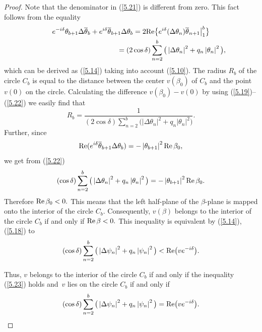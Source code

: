 \documentclass[11pt]{article}
\numberwithin{equation}{section}
\begin{document}
\begin{proof}
Note that the denominator in (\ref{5.21}) is dif\/ferent from zero. This fact
follows from the equality%
\begin{gather}
e^{-i\delta }\theta _{b+1}\Delta \overline{\theta }_{b}+e^{i\delta }%
\overline{\theta }_{b+1}\Delta \theta _{b}=2{\rm Re}\big\{ e^{i\delta
}(\Delta \theta _{n})\overline{\theta }_{n+1}\big|_{1}^{b}\big\}\nonumber\\
\phantom{e^{-i\delta }\theta _{b+1}\Delta \overline{\theta }_{b}+e^{i\delta }%
\overline{\theta }_{b+1}\Delta \theta _{b}}{}
=(2\cos \delta )\sum_{n=2}^{b}\big( \left\vert \Delta \theta
_{n}\right\vert ^{2}+q_{n}\left\vert \theta _{n}\right\vert ^{2}\big),
\label{5.22}
\end{gather}%
which can be derived as (\ref{5.14}) taking into account (\ref{5.10}). The
radius $R_{b}$ of the circle $C_{b}$ is equal to the distance between the
center $v(\beta _{0})$ of $C_{b}$ and the point $v(0)$ on the circle.
Calculating the dif\/ference $v(\beta _{0})-v(0)$ by using (\ref{5.19})--(\ref{5.22}) we easily f\/ind that%
\[
R_{b}=\frac{1}{(2\cos \delta )\sum\limits_{n=2}^{b}\big( \left\vert \Delta \theta
_{n}\right\vert ^{2}+q_{n}\left\vert \theta _{n}\right\vert ^{2}\big) }.
\]%
Further, since%
\[
{\rm Re}(e^{i\delta }\overline{\theta }_{b+1}\Delta \theta
_{b})=-\left\vert \theta _{b+1}\right\vert ^{2}{\rm Re}\,\beta _{0},
\]%
we get from (\ref{5.22})%
\[
(\cos \delta )\sum_{n=2}^{b}\big( \left\vert \Delta \theta _{n}\right\vert
^{2}+q_{n}\left\vert \theta _{n}\right\vert ^{2}\big) =-\left\vert \theta
_{b+1}\right\vert ^{2}{\rm Re}\, \beta _{0}.
\]%
Therefore ${\rm Re}\,\beta _{0}<0.$ This means that the left half-plane of
the $\beta $-plane is mapped onto the interior of the circle $C_{b}.$
Consequently, $v(\beta )$ belongs to the interior of the circle $C_{b}$ if
and only if ${\rm Re}\,\beta <0.$ This inequality is equivalent by (\ref{5.14}), (\ref{5.18}) to%
\begin{equation}
(\cos \delta )\sum_{n=2}^{b}\big( \left\vert \Delta \psi _{n}\right\vert
^{2}+q_{n}\left\vert \psi _{n}\right\vert ^{2}\big) <{\rm Re}\big(ve^{-i\delta }\big).  \label{5.23}
\end{equation}

Thus, $v$ belongs to the interior of the circle $C_{b}$ if and only if the
inequality (\ref{5.23}) holds and~$v$ lies on the circle $C_{b}$ if and only
if%
\[
(\cos \delta )\sum_{n=2}^{b}\big( \left\vert \Delta \psi _{n}\right\vert
^{2}+q_{n}\left\vert \psi _{n}\right\vert ^{2}\big) ={\rm Re}
\big(ve^{-i\delta }\big).
\]


\end{proof}
\end{document}
